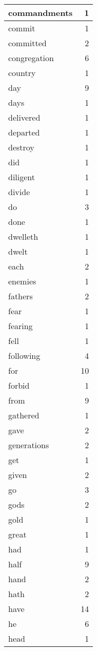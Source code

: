 \begin{center}
\begin{longtable}{l|r}
commandments & 1\\ \hline 
commit & 1\\ \hline 
committed & 2\\ \hline 
congregation & 6\\ \hline 
country & 1\\ \hline 
day & 9\\ \hline 
days & 1\\ \hline 
delivered & 1\\ \hline 
departed & 1\\ \hline 
destroy & 1\\ \hline 
did & 1\\ \hline 
diligent & 1\\ \hline 
divide & 1\\ \hline 
do & 3\\ \hline 
done & 1\\ \hline 
dwelleth & 1\\ \hline 
dwelt & 1\\ \hline 
each & 2\\ \hline 
enemies & 1\\ \hline 
fathers & 2\\ \hline 
fear & 1\\ \hline 
fearing & 1\\ \hline 
fell & 1\\ \hline 
following & 4\\ \hline 
for & 10\\ \hline 
forbid & 1\\ \hline 
from & 9\\ \hline 
gathered & 1\\ \hline 
gave & 2\\ \hline 
generations & 2\\ \hline 
get & 1\\ \hline 
given & 2\\ \hline 
go & 3\\ \hline 
gods & 2\\ \hline 
gold & 1\\ \hline 
great & 1\\ \hline 
had & 1\\ \hline 
half & 9\\ \hline 
hand & 2\\ \hline 
hath & 2\\ \hline 
have & 14\\ \hline 
he & 6\\ \hline 
head & 1\\ \hline 

\end{longtable}
\end{center}
